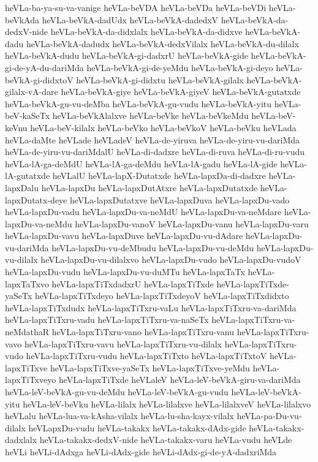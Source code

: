 {heVLa-ba-ya-su-va-vanige
heVLa-beVDA
heVLa-beVDa
heVLa-beVDi
heVLa-beVkAda
heVLa-beVkA-dadUdx
heVLa-beVkA-dadedxV
heVLa-beVkA-da-dedxV-nide
heVLa-beVkA-da-didxlalx
heVLa-beVkA-da-didxve
heVLa-beVkA-dadu
heVLa-beVkA-dadudx
heVLa-beVkA-dedxVilalx
heVLa-beVkA-du-dilalx
heVLa-beVkA-dudu
heVLa-beVkA-gi-dadxrU
heVLa-beVkA-gide
heVLa-beVkA-gi-de-yA-du-dariMda
heVLa-beVkA-gi-de-yeMdu
heVLa-beVkA-gi-deyo
heVLa-beVkA-gi-didxtoV
heVLa-beVkA-gi-didxtu
heVLa-beVkA-gilalx
heVLa-beVkA-gilalx-vA-dare
heVLa-beVkA-giye
heVLa-beVkA-giyeV
heVLa-beVkA-gutatxde
heVLa-beVkA-gu-vu-deMba
heVLa-beVkA-gu-vudu
heVLa-beVkA-yitu
heVLa-beV-kaSeTx
heVLa-beVkAlalxve
heVLa-beVke
heVLa-beVkeMdu
heVLa-beV-keVnu
heVLa-beV-kilalx
heVLa-beVko
heVLa-beVkoV
heVLa-beVku
heVLada
heVLa-daMte
heVLade
heVLadeV
heVLa-de-yiruva
heVLa-de-yiru-vu-dariMda
heVLa-de-yiru-vu-dariMdalU
heVLa-di-dadxre
heVLa-di-ruva
heVLa-di-ru-vudu
heVLa-lA-ga-deMdU
heVLa-lA-ga-deMdu
heVLa-lA-gadu
heVLa-lA-gide
heVLa-lA-gutatxde
heVLalU
heVLa-lapX-Dutatxde
heVLa-lapxDa-di-dadxre
heVLa-lapxDalu
heVLa-lapxDu
heVLa-lapxDutAtxre
heVLa-lapxDutatxde
heVLa-lapxDutatx-deye
heVLa-lapxDutatxve
heVLa-lapxDuva
heVLa-lapxDu-vado
heVLa-lapxDu-vadu
heVLa-lapxDu-va-neMdU
heVLa-lapxDu-va-neMdare
heVLa-lapxDu-va-neMdu
heVLa-lapxDu-vanoV
heVLa-lapxDu-vanu
heVLa-lapxDu-varu
heVLa-lapxDu-vavu
heVLa-lapxDuve
heVLa-lapxDu-vu-dAdare
heVLa-lapxDu-vu-dariMda
heVLa-lapxDu-vu-deMbudu
heVLa-lapxDu-vu-deMdu
heVLa-lapxDu-vu-dilalx
heVLa-lapxDu-vu-dilalxvo
heVLa-lapxDu-vudo
heVLa-lapxDu-vudoV
heVLa-lapxDu-vudu
heVLa-lapxDu-vu-duMTu
heVLa-lapxTaTx
heVLa-lapxTaTxvo
heVLa-lapxTiTxdadxrU
heVLa-lapxTiTxde
heVLa-lapxTiTxde-yaSeTx
heVLa-lapxTiTxdeyo
heVLa-lapxTiTxdeyoV
heVLa-lapxTiTxdidxto
heVLa-lapxTiTxdudx
heVLa-lapxTiTxru-vaLu
heVLa-lapxTiTxru-va-dariMda
heVLa-lapxTiTxru-vadu
heVLa-lapxTiTxru-va-naSeTx
heVLa-lapxTiTxru-va-neMdathaR
heVLa-lapxTiTxru-vano
heVLa-lapxTiTxru-vanu
heVLa-lapxTiTxru-vavo
heVLa-lapxTiTxru-vavu
heVLa-lapxTiTxru-vu-dilalx
heVLa-lapxTiTxru-vudo
heVLa-lapxTiTxru-vudu
heVLa-lapxTiTxto
heVLa-lapxTiTxtoV
heVLa-lapxTiTxve
heVLa-lapxTiTxve-yaSeTx
heVLa-lapxTiTxve-yeMdu
heVLa-lapxTiTxveyo
heVLa-lapxTiTxde
heVLaleV
heVLa-leV-beVkA-giru-va-dariMda
heVLa-leV-beVkA-gu-vu-deMdu
heVLa-leV-beVkA-gu-vudu
heVLa-leV-beVkA-yitu
heVLa-leV-beVku
heVLa-lilalx
heVLa-lilalxve
heVLa-lilalxveV
heVLa-lilalxvo
heVLalu
heVLa-lua-va-kAsha-vilalx
heVLa-lu-sha-kayx-vilalx
heVLa-pa-Du-vu-dilalx
heVLapxDu-vudu
heVLa-takakx
heVLa-takakx-dAdx-gide
heVLa-takakx-dadxlalx
heVLa-takakx-dedxV-nide
heVLa-takakx-varu
heVLa-vudu
heVLde
heVLi
heVLi-dAdxga
heVLi-dAdx-gide
heVLi-dAdx-gi-de-yA-dadxriMda
}

